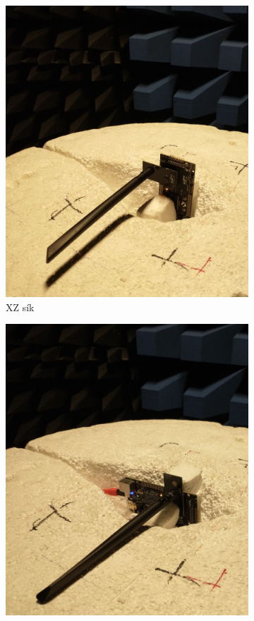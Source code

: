 \begin{figure}
\begin{subfigure}{0.3\textwidth}
                    \includegraphics[width=\textwidth]{kep/szerkesztett/botantenna_XZ.jpg}
                    \caption{XZ sík}
                \end{subfigure}
                \begin{subfigure}{0.3\textwidth}
                    \includegraphics[width=\textwidth]{kep/szerkesztett/botantenna_YZ.jpg}

\end{subfigure}
\end{figure}
